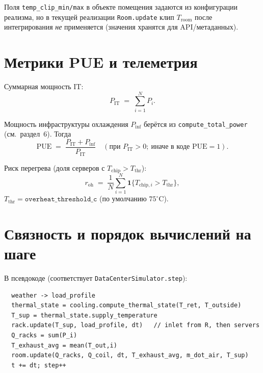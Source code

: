 \documentclass[12pt,a4paper]{article}
\begin{document}
Поля \texttt{temp\_clip\_min/max} в объекте помещения задаются из конфигурации реализма, но в текущей
реализации \texttt{Room.update} клип $T_{\mathrm{room}}$ после интегрирования \emph{не} применяется
(значения хранятся для API/метаданных).

\section{Метрики PUE и телеметрия}

Суммарная мощность IT:
\begin{equation}
  P_{\mathrm{IT}} \;=\; \sum_{i=1}^{N} P_i .
\end{equation}

Мощность инфраструктуры охлаждения $P_{\mathrm{inf}}$ берётся из \texttt{compute\_total\_power} (см.\ раздел~6).
Тогда
\begin{equation}
  \mathrm{PUE} \;=\; \frac{P_{\mathrm{IT}} + P_{\mathrm{inf}}}{P_{\mathrm{IT}}}
  \quad (\text{при } P_{\mathrm{IT}}>0;\ \text{иначе в коде } \mathrm{PUE}=1).
\end{equation}

Риск перегрева (доля серверов с $T_{\mathrm{chip}} > T_{\mathrm{thr}}$):
\begin{equation}
  r_{\mathrm{oh}} \;=\; \frac{1}{N}\sum_{i=1}^{N} \mathbf{1}\{ T_{\mathrm{chip},i} > T_{\mathrm{thr}}\},
\end{equation}
$T_{\mathrm{thr}} = \texttt{overheat\_threshold\_c}$ (по умолчанию $75^\circ\mathrm{C}$).

\section{Связность и порядок вычислений на шаге}

В псевдокоде (соответствует \texttt{DataCenterSimulator.step}):
\begin{verbatim}
  weather -> load_profile
  thermal_state = cooling.compute_thermal_state(T_ret, T_outside)
  T_sup = thermal_state.supply_temperature
  rack.update(T_sup, load_profile, dt)   // inlet from R, then servers
  Q_racks = sum(P_i)
  T_exhaust_avg = mean(T_out,i)
  room.update(Q_racks, Q_coil, dt, T_exhaust_avg, m_dot_air, T_sup)
  t += dt; step++
\end{verbatim}
\end{document}

